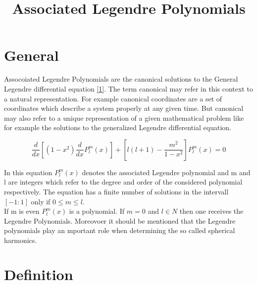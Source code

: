 \documentclass[a4paper,12pt]{article}
\begin{document}
\pagestyle{fancy}

\title{Associated Legendre Polynomials}
\maketitle

\section{General}

Assocoiated Legendre Polynomials are the canonical solutions to the General Legendre differential equation \ref{1}. The term canonical may refer in this context
to a natural representation. For example canonical coordinates are a set of coordinates which describe a system properly at any given time. But canonical
may also refer to a unique representation of a given mathematical problem like for example the solutions to the generalized Legendre differential equation.

\begin{equation}
 \frac{d}{dx} \left [ \left ( 1-x^{2} \right )\frac{d}{dx}P_{l}^{m} \left ( x \right ) \right ] + \left [ l\left( l + 1 \right ) 
   - \frac{m^{2}}{1-x^{2}} \right ]P_{l}^{m} \left ( x \right ) = 0
   \label{1}
\end{equation}

\noindent
In this equation $P_{l}^{m} \left ( x \right )$ denotes the associated Legendre polynomial and m and l are integers which refer to the degree and order
of the considered polynomial respectively. The equation has a finite number of solutions in the intervall $[-1:1]$ only if $0\leq m\leq l$.\\
If m is even $P_{l}^{m} \left ( x \right )$ is a polynomial. If $m=0$ and $l \in N $ then one receives the Legendre Polynomials. 
Moreovoer it should be mentioned that the Legendre polynomials play an mportant role when determining the so called spherical harmonics.

\section{Definition}
\end{document}
